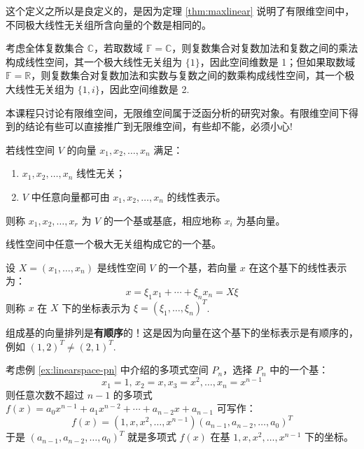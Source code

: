 \begin{com}
这个定义之所以是良定义的，是因为定理 \ref{thm:maxlinear} 说明了有限维空间中，不同极大线性无关组所含向量的个数是相同的。
\end{com}

\begin{example}
考虑全体复数集合 $\mathbb C$，若取数域 $\mathbb F=\mathbb C$，则复数集合对复数加法和复数之间的乘法构成线性空间，其一个极大线性无关组为 $\{1\}$，因此空间维数是 1；但如果取数域 $\mathbb F=\mathbb R$，则复数集合对复数加法和实数与复数之间的数乘构成线性空间，其一个极大线性无关组为 $\{1,i\}$，因此空间维数是 2.
\end{example}

\begin{remark}
本课程只讨论有限维空间，无限维空间属于泛函分析的研究对象。有限维空间下得到的结论有些可以直接推广到无限维空间，有些却不能，必须小心!
\end{remark}

\begin{definition}[基]
若线性空间 $V$ 的向量 $x_1,x_2,\ldots,x_n$ 满足：
\begin{enumerate}
    \item $x_1,x_2,\ldots,x_n$ 线性无关；
    \item $V$ 中任意向量都可由 $x_1,x_2,\ldots,x_n$ 的线性表示。
\end{enumerate}
则称 $x_1,x_2,\ldots,x_r$ 为 $V$ 的一个基或基底，相应地称 $x_i$ 为基向量。
\end{definition}

\begin{corollary}
线性空间中任意一个极大无关组构成它的一个基。
\end{corollary}

\begin{definition}[坐标表示]
设 $X=(x_1,\ldots,x_n)$ 是线性空间 $V$ 的一个基，若向量 $x$ 在这个基下的线性表示为：
\[x=\xi_1 x_1+\cdots+\xi_nx_n=X\xi\]
则称 $x$ 在 $X$ 下的坐标表示为 $\xi=(\xi_1,\ldots,\xi_n)^{T}$.
\end{definition}

\begin{note}
组成基的向量排列是\textbf{有顺序}的！这是因为向量在这个基下的坐标表示是有顺序的，例如 $(1,2)^T\neq (2,1)^T$.
\end{note}

\begin{example}
考虑例 \ref{ex:linearspace-pn} 中介绍的多项式空间 $P_n$，选择 $P_n$ 中的一个基：
\[
    x_1=1,\,x_2=x,x_3=x^2,\ldots,x_n=x^{n-1}
\]
则任意次数不超过 $n-1$ 的多项式 $f(x)=a_0x^{n-1}+a_1x^{n-2}+\cdots+a_{n-2}x+a_{n-1}$ 可写作：
\[
    f(x)=(1,x,x^2,\ldots,x^{n-1})(a_{n-1},a_{n-2},\ldots,a_0)^T
\]
于是 $(a_{n-1},a_{n-2},\ldots,a_0)^T$ 就是多项式 $f(x)$ 在基 $1,x,x^2,\ldots,x^{n-1}$ 下的坐标。
\end{example}

